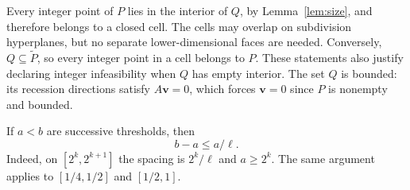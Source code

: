 \documentclass[11pt]{article}
\theoremstyle{definition}\newtheorem{definition}{Definition}[section]
\theoremstyle{remark}\newtheorem{remark}[theorem]{Remark}
\begin{document}
Every integer point of $P$ lies in the interior of $Q$, by Lemma~\ref{lem:size}, and therefore belongs to a closed cell. The cells may overlap on subdivision hyperplanes, but no separate lower-dimensional faces are needed. Conversely, $Q\subseteq\widetilde P$, so every integer point in a cell belongs to $P$. These statements also justify declaring integer infeasibility when $Q$ has empty interior. The set $Q$ is bounded: its recession directions satisfy $A\mathbf v=0$, which forces $\mathbf v=0$ since $P$ is nonempty and bounded.

If $a<b$ are successive thresholds, then
\begin{equation}\label{eq:width}
 b-a\le a/\ell.
\end{equation}
Indeed, on $[2^k,2^{k+1}]$ the spacing is $2^k/\ell$ and $a\ge2^k$. The same argument applies to $[1/4,1/2]$ and $[1/2,1]$.
\end{document}
